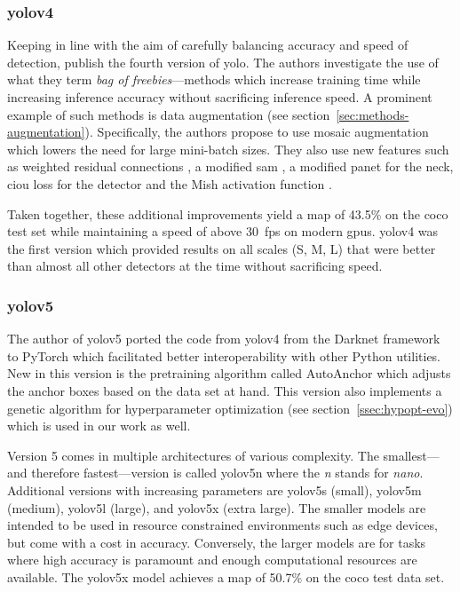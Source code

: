 \documentclass[draft,final]{vutinfth} %
\begin{document}
\subsubsection{\gls{yolo}v4}
\label{sssec:yolov4}

Keeping in line with the aim of carefully balancing accuracy and speed
of detection, \textcite{bochkovskiy2020} publish the fourth version of
\gls{yolo}. The authors investigate the use of what they term
\emph{bag of freebies}---methods which increase training time while
increasing inference accuracy without sacrificing inference speed. A
prominent example of such methods is data augmentation (see
section~\ref{sec:methods-augmentation}). Specifically, the authors
propose to use mosaic augmentation which lowers the need for large
mini-batch sizes. They also use new features such as weighted residual
connections \cite{shen2016}, a modified \gls{sam} \cite{woo2018}, a
modified \gls{panet} \cite{liu2018} for the neck, \gls{ciou} loss
\cite{zheng2020} for the detector and the Mish activation function
\cite{misra2020}.

Taken together, these additional improvements yield a \gls{map} of
43.5\% on the \gls{coco} test set while maintaining a speed of above
\qty{30}{fps} on modern \glspl{gpu}. \gls{yolo}v4 was the first
version which provided results on all scales (S, M, L) that were
better than almost all other detectors at the time without sacrificing
speed.

\subsubsection{\gls{yolo}v5}
\label{sssec:yolov5}

The author of \gls{yolo}v5 \cite{jocher2020} ported the code from
\gls{yolo}v4 from the Darknet framework to PyTorch which facilitated
better interoperability with other Python utilities. New in this
version is the pretraining algorithm called AutoAnchor which adjusts
the anchor boxes based on the data set at hand. This version also
implements a genetic algorithm for hyperparameter optimization (see
section~\ref{ssec:hypopt-evo}) which is used in our work as well.

Version 5 comes in multiple architectures of various complexity. The
smallest---and therefore fastest---version is called \gls{yolo}v5n where
the \emph{n} stands for \emph{nano}. Additional versions with
increasing parameters are \gls{yolo}v5s (small), \gls{yolo}v5m
(medium), \gls{yolo}v5l (large), and \gls{yolo}v5x (extra large). The
smaller models are intended to be used in resource constrained
environments such as edge devices, but come with a cost in
accuracy. Conversely, the larger models are for tasks where high
accuracy is paramount and enough computational resources are
available. The \gls{yolo}v5x model achieves a \gls{map} of 50.7\% on
the \gls{coco} test data set.
\end{document}
